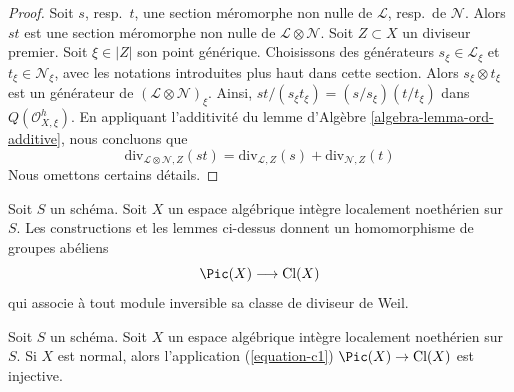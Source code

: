 \begin{proof}
Soit $s$, resp.\ $t$, une section méromorphe non nulle de
$\mathcal{L}$, resp.\ de $\mathcal{N}$. Alors $st$ est une section
méromorphe non nulle de $\mathcal{L} \otimes \mathcal{N}$.
Soit $Z \subset X$ un diviseur premier. Soit $\xi \in |Z|$ son point
générique. Choisissons des générateurs $s_\xi \in \mathcal{L}_\xi$ et
$t_\xi \in \mathcal{N}_\xi$, avec les notations introduites plus haut
dans cette section. Alors $s_\xi \otimes t_\xi$ est un générateur
de $(\mathcal{L} \otimes \mathcal{N})_\xi$.
Ainsi, $st/(s_\xi t_\xi) = (s/s_\xi)(t/t_\xi)$ dans
$Q(\mathcal{O}_{X, \xi}^h)$. En appliquant l'additivité du
lemme d'Algèbre \ref{algebra-lemma-ord-additive},
nous concluons que
$$
\text{div}_{\mathcal{L} \otimes \mathcal{N}, Z}(st)
=
\text{div}_{\mathcal{L}, Z}(s) + \text{div}_{\mathcal{N}, Z}(t)
$$
Nous omettons certains détails.
\end{proof}

\noindent
Soit $S$ un schéma. Soit $X$ un espace algébrique intègre localement noethérien
sur $S$. Les constructions et les lemmes ci-dessus donnent un homomorphisme
de groupes abéliens
\begin{equation}
\label{equation-c1}
\Pic(X) \longrightarrow \text{Cl}(X)
\end{equation}
qui associe à tout module inversible sa classe de diviseur de Weil.

\begin{lemma}
\label{lemma-normal-c1-injective}
Soit $S$ un schéma. Soit $X$ un espace algébrique intègre localement noethérien
sur $S$. Si $X$ est normal, alors l'application (\ref{equation-c1})
$\Pic(X) \to \text{Cl}(X)$ est injective.
\end{lemma}

